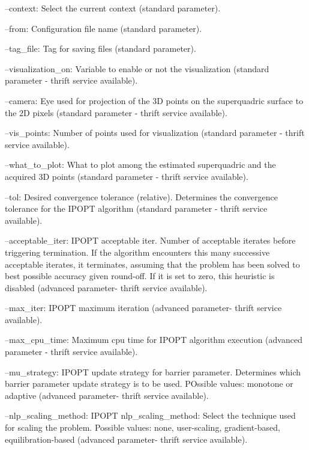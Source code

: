 \begin{DoxyItemize}
\item --context\-: Select the current context (standard parameter).
\item --from\-: Configuration file name (standard parameter).
\item --tag\-\_\-file\-: Tag for saving files (standard parameter).
\item --visualization\-\_\-on\-: Variable to enable or not the visualization (standard parameter -\/ thrift service available).
\item --camera\-: Eye used for projection of the 3\-D points on the superquadric surface to the 2\-D pixels (standard parameter -\/ thrift service available).
\item --vis\-\_\-points\-: Number of points used for visualization (standard parameter -\/ thrift service available).
\item --what\-\_\-to\-\_\-plot\-: What to plot among the estimated superquadric and the acquired 3\-D points (standard parameter -\/ thrift service available).
\item --tol\-: Desired convergence tolerance (relative). Determines the convergence tolerance for the I\-P\-O\-P\-T algorithm (standard parameter -\/ thrift service available).
\item --acceptable\-\_\-iter\-: I\-P\-O\-P\-T acceptable iter. Number of acceptable iterates before triggering termination. If the algorithm encounters this many successive acceptable iterates, it terminates, assuming that the problem has been solved to best possible accuracy given round-\/off. If it is set to zero, this heuristic is disabled (advanced parameter-\/ thrift service available).
\item --max\-\_\-iter\-: I\-P\-O\-P\-T maximum iteration (advanced parameter-\/ thrift service available).
\item --max\-\_\-cpu\-\_\-time\-: Maximum cpu time for I\-P\-O\-P\-T algorithm execution (advanced parameter -\/ thrift service available).
\item --mu\-\_\-strategy\-: I\-P\-O\-P\-T update strategy for barrier parameter. Determines which barrier parameter update strategy is to be used. P\-Ossible values\-: monotone or adaptive (advanced parameter-\/ thrift service available).
\item --nlp\-\_\-scaling\-\_\-method\-: I\-P\-O\-P\-T nlp\-\_\-scaling\-\_\-method\-: Select the technique used for scaling the problem. Possible values\-: none, user-\/scaling, gradient-\/based, equilibration-\/based (advanced parameter-\/ thrift service available).

\end{DoxyItemize}

